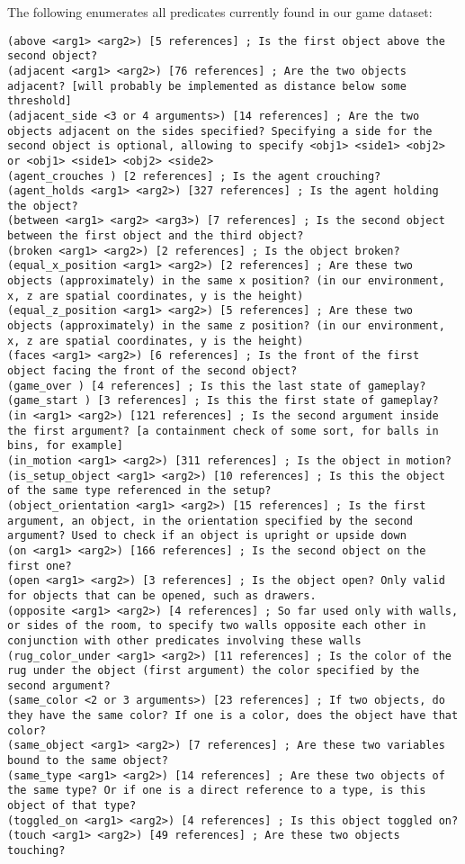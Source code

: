 \documentclass{article}
\begin{document}
The following enumerates all predicates currently found in our game dataset:

\begin{lstlisting}
(above <arg1> <arg2>) [5 references] ; Is the first object above the second object?
(adjacent <arg1> <arg2>) [76 references] ; Are the two objects adjacent? [will probably be implemented as distance below some threshold]
(adjacent_side <3 or 4 arguments>) [14 references] ; Are the two objects adjacent on the sides specified? Specifying a side for the second object is optional, allowing to specify <obj1> <side1> <obj2> or <obj1> <side1> <obj2> <side2>
(agent_crouches ) [2 references] ; Is the agent crouching?
(agent_holds <arg1> <arg2>) [327 references] ; Is the agent holding the object?
(between <arg1> <arg2> <arg3>) [7 references] ; Is the second object between the first object and the third object?
(broken <arg1> <arg2>) [2 references] ; Is the object broken?
(equal_x_position <arg1> <arg2>) [2 references] ; Are these two objects (approximately) in the same x position? (in our environment, x, z are spatial coordinates, y is the height)
(equal_z_position <arg1> <arg2>) [5 references] ; Are these two objects (approximately) in the same z position? (in our environment, x, z are spatial coordinates, y is the height)
(faces <arg1> <arg2>) [6 references] ; Is the front of the first object facing the front of the second object?
(game_over ) [4 references] ; Is this the last state of gameplay?
(game_start ) [3 references] ; Is this the first state of gameplay?
(in <arg1> <arg2>) [121 references] ; Is the second argument inside the first argument? [a containment check of some sort, for balls in bins, for example]
(in_motion <arg1> <arg2>) [311 references] ; Is the object in motion?
(is_setup_object <arg1> <arg2>) [10 references] ; Is this the object of the same type referenced in the setup?
(object_orientation <arg1> <arg2>) [15 references] ; Is the first argument, an object, in the orientation specified by the second argument? Used to check if an object is upright or upside down
(on <arg1> <arg2>) [166 references] ; Is the second object on the first one?
(open <arg1> <arg2>) [3 references] ; Is the object open? Only valid for objects that can be opened, such as drawers.
(opposite <arg1> <arg2>) [4 references] ; So far used only with walls, or sides of the room, to specify two walls opposite each other in conjunction with other predicates involving these walls
(rug_color_under <arg1> <arg2>) [11 references] ; Is the color of the rug under the object (first argument) the color specified by the second argument?
(same_color <2 or 3 arguments>) [23 references] ; If two objects, do they have the same color? If one is a color, does the object have that color?
(same_object <arg1> <arg2>) [7 references] ; Are these two variables bound to the same object?
(same_type <arg1> <arg2>) [14 references] ; Are these two objects of the same type? Or if one is a direct reference to a type, is this object of that type?
(toggled_on <arg1> <arg2>) [4 references] ; Is this object toggled on?
(touch <arg1> <arg2>) [49 references] ; Are these two objects touching?
\end{lstlisting}
\end{document}
